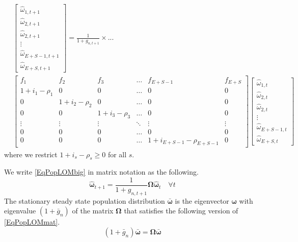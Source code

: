 \documentclass[letterpaper,12pt]{article}
\theoremstyle{definition}
\begin{document}
  \begin{equation}\label{EqPopLOMbig}
  \begin{split}
    & \begin{bmatrix}
      \hat{\omega}_{1,t+1} \\ \hat{\omega}_{2,t+1} \\ \hat{\omega}_{2,t+1} \\ \vdots \\ \hat{\omega}_{E+S-1,t+1} \\ \hat{\omega}_{E+S,t+1}
    \end{bmatrix}= \frac{1}{1 + g_{n,t+1}} \times ... \\
    & \begin{bmatrix}
      f_1 & f_2 & f_3 & \hdots & f_{E+S-1} & f_{E+S} \\
      1+i_1-\rho_1 & 0 & 0 & \hdots & 0 & 0 \\
      0 & 1+i_2-\rho_2 & 0 & \hdots & 0 & 0 \\
      0 & 0 & 1+i_3-\rho_3 & \hdots & 0 & 0 \\
      \vdots & \vdots & \vdots & \ddots & \vdots & \vdots \\
      0 & 0 & 0 & \hdots & 0 & 0 \\
      0 & 0 & 0 & \hdots & 1+i_{E+S-1}-\rho_{E+S-1} & 0
    \end{bmatrix}
    \begin{bmatrix}
      \hat{\omega}_{1,t} \\ \hat{\omega}_{2,t} \\ \hat{\omega}_{2,t} \\ \vdots \\ \hat{\omega}_{E+S-1,t} \\ \hat{\omega}_{E+S,t}
    \end{bmatrix}
  \end{split}
  \end{equation}
  where we restrict $1+i_s-\rho_s\geq 0$ for all $s$.

  We write \eqref{EqPopLOMbig} in matrix notation as the following.
  \begin{equation}\label{EqPopLOMmat}
    \bm{\hat{\omega}}_{t+1} = \frac{1}{1+g_{n,t+1}}\bm{\Omega}\bm{\hat{\omega}}_t \quad\forall t
  \end{equation}
  The stationary steady state population distribution $\bm{\bar{\omega}}$ is the eigenvector $\bm{\omega}$ with eigenvalue $(1+\bar{g}_n)$ of the matrix $\bm{\Omega}$ that satisfies the following version of \eqref{EqPopLOMmat}.
  \begin{equation}\label{EqPopLOMss}
    (1+\bar{g}_n)\bm{\bar{\omega}} = \bm{\Omega}\bm{\bar{\omega}}
  \end{equation}
\end{document}

